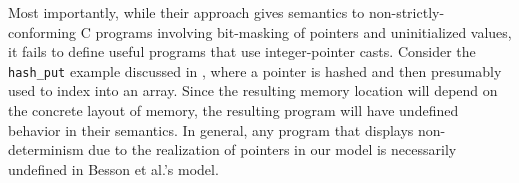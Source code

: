 Most importantly, while their approach gives semantics to non-strictly-conforming C programs involving bit-masking of pointers and
uninitialized values, it fails to define useful programs that use
integer-pointer casts.  Consider the \texttt{hash\_put} example
discussed in , where a pointer is hashed and
then presumably used to index into an array.  Since the resulting
memory location will depend on the concrete layout of memory, the
resulting program will have undefined behavior in their semantics.  In
general, any program that displays non-determinism due to the
realization of pointers in our model is necessarily undefined in Besson et al.'s
model.







